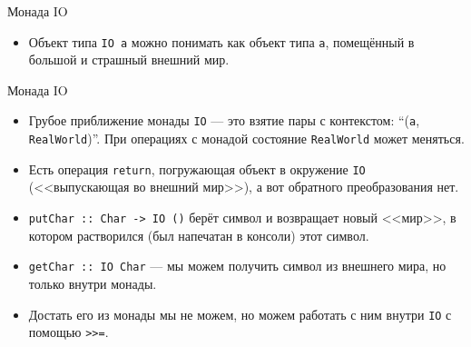 \documentclass[xcolor=dvipsnames]{beamer}
\begin{document}
\begin{frame}{Монада IO}
 
 \begin{itemize}
  \item Объект типа \texttt{IO a} можно понимать как объект типа \texttt{a}, помещённый в большой и страшный внешний мир.
 \end{itemize}

 
\end{frame}

\begin{frame}{Монада IO}
 
 \begin{itemize}[<+->]
  \item Грубое приближение монады \texttt{IO} --- это взятие пары с контекстом: ``({\tt a}, {\tt RealWorld})''. При операциях с монадой состояние {\tt RealWorld} может меняться. 
  \item Есть операция \texttt{return}, погружающая объект в окружение \texttt{IO} (<<выпускающая во внешний мир>>), а вот обратного преобразования нет.
  \item \texttt{putChar :: Char -> IO ()} берёт символ и возвращает новый <<мир>>, в котором растворился (был напечатан в консоли) этот символ.
  \item \texttt{getChar :: IO Char} --- мы можем получить символ из внешнего мира, но только внутри монады.
  \item Достать его из монады мы не можем, но можем работать с ним внутри \texttt{IO} с помощью \texttt{>>=}.
 \end{itemize}

 
\end{frame}
\end{document}
